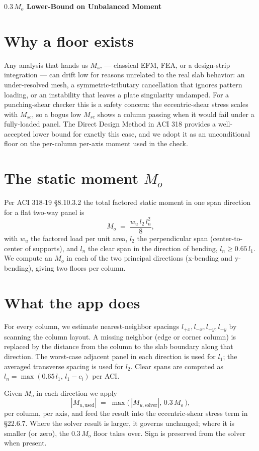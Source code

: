 \documentclass[10pt]{article}
\begin{document}
\begin{center}{\large\bfseries $0.3\,M_o$ Lower-Bound on Unbalanced Moment}\end{center}

\section*{Why a floor exists}
Any analysis that hands us $M_{sc}$ --- classical EFM, FEA, or a design-strip integration --- can drift low for reasons unrelated to the real slab behavior: an under-resolved mesh, a symmetric-tributary cancellation that ignores pattern loading, or an instability that leaves a plate singularity undamped. For a punching-shear checker this is a safety concern: the eccentric-shear stress scales with $M_{sc}$, so a bogus low $M_{sc}$ shows a column passing when it would fail under a fully-loaded panel. The Direct Design Method in ACI 318 provides a well-accepted lower bound for exactly this case, and we adopt it as an unconditional floor on the per-column per-axis moment used in the check.

\section*{The static moment $M_o$}
Per ACI 318-19 \S 8.10.3.2 the total factored static moment in one span direction for a flat two-way panel is
\[
M_o \;=\; \frac{w_u\, l_2\, l_n^2}{8},
\]
with $w_u$ the factored load per unit area, $l_2$ the perpendicular span (center-to-center of supports), and $l_n$ the clear span in the direction of bending, $l_n \geq 0.65\,l_1$. We compute an $M_o$ in each of the two principal directions (x-bending and y-bending), giving two floors per column.

\section*{What the app does}
For every column, we estimate nearest-neighbor spacings $l_{+x}, l_{-x}, l_{+y}, l_{-y}$ by scanning the column layout. A missing neighbor (edge or corner column) is replaced by the distance from the column to the slab boundary along that direction. The worst-case adjacent panel in each direction is used for $l_1$; the averaged transverse spacing is used for $l_2$. Clear spans are computed as $l_n = \max(0.65\,l_1,\, l_1 - c_i)$ per ACI.

Given $M_o$ in each direction we apply
\[
|M_{u,\text{used}}|
\;=\; \max\!\bigl(\,|M_{u,\text{solver}}|,\, 0.3\, M_o\,\bigr),
\]
per column, per axis, and feed the result into the eccentric-shear stress term in \S 22.6.7. Where the solver result is larger, it governs unchanged; where it is smaller (or zero), the $0.3\,M_o$ floor takes over. Sign is preserved from the solver when present.
\end{document}
